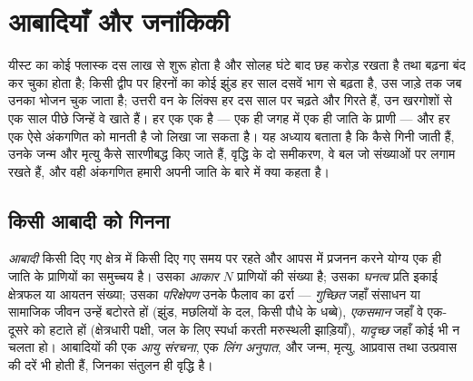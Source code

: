 \chapter{आबादियाँ और जनांकिकी}\label{ch:b1:populations}

यीस्ट का कोई फ्लास्क दस लाख  से शुरू होता है और सोलह घंटे बाद छह
करोड़ रखता है तथा बढ़ना बंद कर चुका होता है; किसी द्वीप पर हिरनों का कोई
झुंड हर साल दसवें भाग से बढ़ता है, उस जाड़े तक जब उनका भोजन चुक जाता है;
उत्तरी वन के लिंक्स हर दस साल पर चढ़ते और गिरते हैं, उन खरगोशों से एक
साल पीछे जिन्हें वे खाते हैं। हर एक एक \emph{} है --- एक ही जगह में
एक ही जाति के प्राणी --- और हर एक ऐसे अंकगणित को मानती है जो लिखा जा
सकता है। यह अध्याय बताता है कि  कैसे गिनी जाती हैं, उनके जन्म और
मृत्यु कैसे सारणीबद्ध किए जाते हैं, वृद्धि के दो समीकरण, वे बल जो
संख्याओं पर लगाम रखते हैं, और वही अंकगणित हमारी अपनी जाति के बारे में
क्या कहता है।

\section{किसी आबादी को गिनना}

\begin{definition}[आबादी, घनत्व, परिक्षेपण]\label{def:b1:populations:population}
\emph{आबादी} किसी दिए गए क्षेत्र में किसी दिए गए समय पर रहते और आपस में
प्रजनन करने योग्य एक ही जाति के प्राणियों का समुच्चय है। उसका
\emph{आकार} $N$ प्राणियों की संख्या है; उसका \emph{घनत्व} प्रति इकाई
क्षेत्रफल या आयतन संख्या; उसका \emph{परिक्षेपण} उनके फैलाव का ढर्रा ---
\emph{गुच्छित} जहाँ संसाधन या सामाजिक जीवन उन्हें बटोरते हों (झुंड,
मछलियों के दल, किसी पौधे के धब्बे), \emph{एकसमान} जहाँ वे एक-दूसरे को
हटाते हों (क्षेत्रधारी पक्षी, जल के लिए स्पर्धा करती मरुस्थली झाड़ियाँ),
\emph{यादृच्छ} जहाँ कोई भी न चलता हो। आबादियों की एक \emph{आयु संरचना},
एक \emph{लिंग अनुपात}, और जन्म, मृत्यु, आप्रवास तथा उत्प्रवास की दरें भी
होती हैं, जिनका संतुलन ही वृद्धि है।
\end{definition}

